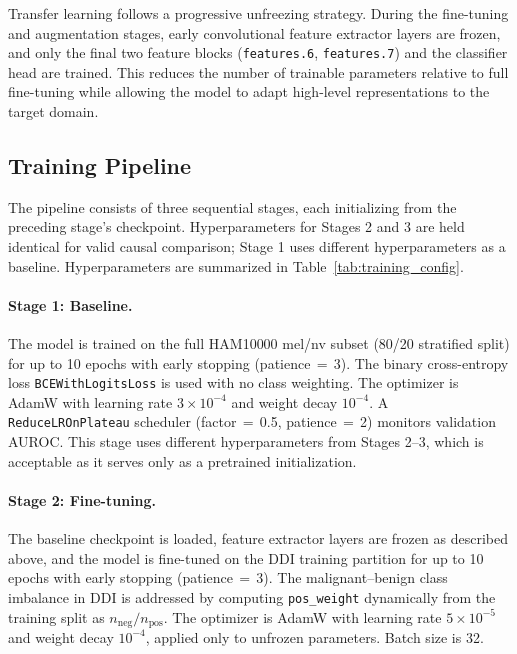 Transfer learning follows a progressive unfreezing strategy. During the fine-tuning and augmentation stages, early convolutional feature extractor layers are frozen, and only the final two feature blocks (\texttt{features.6}, \texttt{features.7}) and the classifier head are trained. This reduces the number of trainable parameters relative to full fine-tuning while allowing the model to adapt high-level representations to the target domain.

\subsection{Training Pipeline}

The pipeline consists of three sequential stages, each initializing from the preceding stage's checkpoint. Hyperparameters for Stages 2 and 3 are held identical for valid causal comparison; Stage 1 uses different hyperparameters as a baseline. Hyperparameters are summarized in Table~\ref{tab:training_config}.

\paragraph{Stage 1: Baseline.}
The model is trained on the full HAM10000 mel/nv subset (80/20 stratified split) for up to 10 epochs with early stopping (patience\,$=$\,3). The binary cross-entropy loss \texttt{BCEWithLogitsLoss} is used with no class weighting. The optimizer is AdamW with learning rate $3 \times 10^{-4}$ and weight decay $10^{-4}$. A \texttt{ReduceLROnPlateau} scheduler (factor\,$=$\,0.5, patience\,$=$\,2) monitors validation AUROC. This stage uses different hyperparameters from Stages 2--3, which is acceptable as it serves only as a pretrained initialization.

\paragraph{Stage 2: Fine-tuning.}
The baseline checkpoint is loaded, feature extractor layers are frozen as described above, and the model is fine-tuned on the DDI training partition for up to 10 epochs with early stopping (patience\,$=$\,3). The malignant--benign class imbalance in DDI is addressed by computing \texttt{pos\_weight} dynamically from the training split as $n_{\text{neg}} / n_{\text{pos}}$. The optimizer is AdamW with learning rate $5 \times 10^{-5}$ and weight decay $10^{-4}$, applied only to unfrozen parameters. Batch size is 32.

